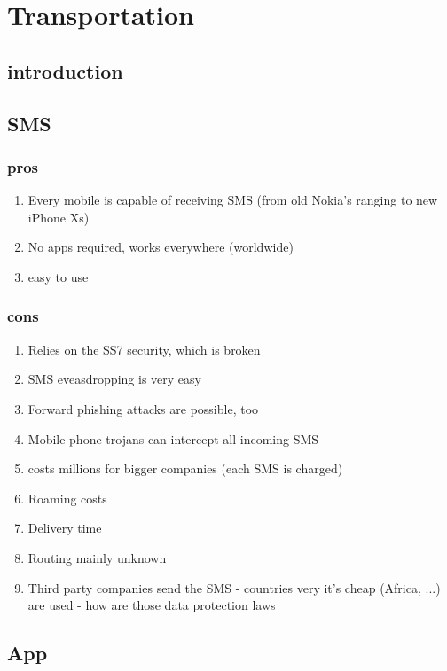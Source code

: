 \section{Transportation}

\subsection{introduction}

\blindtext

\subsection{SMS}

\subsubsection{pros}

\begin{enumerate}
	\item Every mobile is capable of receiving SMS (from old Nokia's ranging to new iPhone Xs)
	\item No apps required, works everywhere (worldwide)
	\item easy to use
\end{enumerate}

\subsubsection{cons}

\begin{enumerate}
	\item Relies on the SS7 security, which is broken
	\item SMS eveasdropping is very easy
	\item Forward phishing attacks are possible, too
	\item Mobile phone trojans can intercept all incoming SMS
	\item costs millions for bigger companies (each SMS is charged)
	\item Roaming costs
	\item Delivery time
	\item Routing mainly unknown
	\item Third party companies send the SMS - countries very it's cheap (Africa, ...) are used - how are those data protection laws
\end{enumerate}

\subsection{App}

